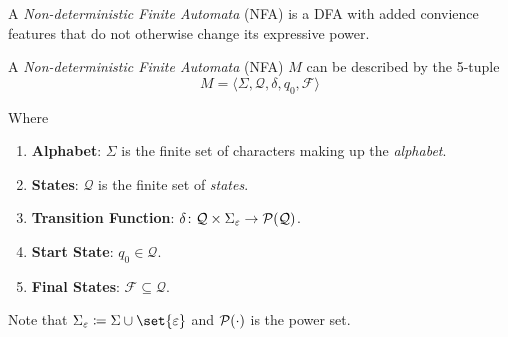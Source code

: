 A \textit{Non-deterministic Finite Automata} (NFA) is a DFA with added convience features that do not otherwise change its expressive power.

\begin{definition}
    A \textit{Non-deterministic Finite Automata} (NFA) $M$ can be described by the 5-tuple
    \begin{equation}
        M = \langle
            \Sigma,
            \mathcal{Q},
            \delta,
            q_0,
            \mathcal{F}
        \rangle
    \end{equation}
    
    Where
    \begin{enumerate}
        \item \textbf{Alphabet}: $\Sigma$ is the finite set of characters making up the \textit{alphabet}.
        \item \textbf{States}: $\mathcal{Q}$ is the finite set of \textit{states}.
        \item \textbf{Transition Function}: $\delta \colon \mathcal{Q} \times \Sigma_{\varepsilon} \to \mathcal{P}(\mathcal{Q})$.
        \item \textbf{Start State}: $q_0 \in \mathcal{Q}$.
        \item \textbf{Final States}: $\mathcal{F} \subseteq \mathcal{Q}$.
    \end{enumerate}
    
    Note that $\Sigma_{\varepsilon} \coloneqq \Sigma \cup \set{\varepsilon}$ and $\mathcal{P}(\cdot)$ is the power set.
\end{definition}

